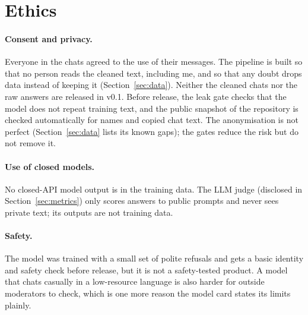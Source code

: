 \documentclass[11pt]{article}
\begin{document}
\section{Ethics}
\label{sec:ethics}
\paragraph{Consent and privacy.} Everyone in the chats agreed to the use of their messages. The pipeline is
built so that no person reads the cleaned text, including me, and so that any doubt drops data instead of
keeping it (Section~\ref{sec:data}). Neither the cleaned chats nor the raw answers are released in v0.1.
Before release, the leak gate checks that the model does not repeat training text, and the public
snapshot of the repository is checked automatically for names and copied chat text. The anonymisation
is not perfect (Section~\ref{sec:data} lists its known gaps); the gates reduce the risk but do not
remove it.

\paragraph{Use of closed models.} No closed-API model output is in the training data. The LLM judge
(disclosed in Section~\ref{sec:metrics}) only scores answers to public prompts and never sees private
text; its outputs are not training data.

\paragraph{Safety.} The model was trained with a small set of polite refusals and gets a basic identity and
safety check before release, but it is not a safety-tested product. A model that chats casually in a
low-resource language is also harder for outside moderators to check, which is one more reason the
model card states its limits plainly.
\end{document}
